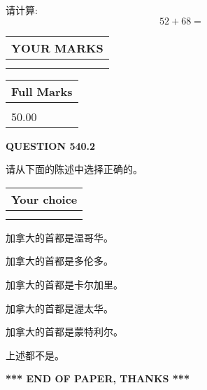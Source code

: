 \documentclass{ctexart}
\begin{document}
  
 
请计算:
\begin{equation}
52 +  %
68 = \nonumber
\end{equation}
 

 

 
  
\vspace{0.2in}
  
\noindent\begin{tabular}{|l|}
\hline
 YOUR MARKS  \\
\hline
 \\ 
 \\ 
\hline
\end{tabular}
\hspace{0.05in} \begin{tabular}{|l|}
\hline
 Full Marks  \\
\hline
 \\ 
50.00 \\
\hline
\end{tabular}
{\textbf{\Large{QUESTION
540.2 
}}}
  
  
请从下面的陈述中选择正确的。
  
  
\noindent\hspace{3.0in} \begin{tabular}{|l|}
\hline
Your choice \\
\hline
 \\ 
 \\ 
\hline
\end{tabular}
  
  
 
 
加拿大的首都是温哥华。
 
 
加拿大的首都是多伦多。
 
 
加拿大的首都是卡尔加里。
 
 
加拿大的首都是渥太华。
 
 
加拿大的首都是蒙特利尔。
 
 
 上述都不是。
 
 
   
   
 \vspace{0.2in}
 
   
   
   
   
\vspace{1.0in} 
{\textbf{\large{ *** END OF PAPER, THANKS *** }}} 
   
\end{document}
